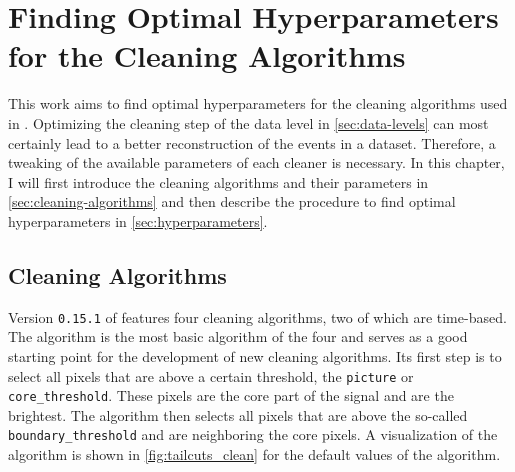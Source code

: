 \chapter{Finding Optimal Hyperparameters for the Cleaning Algorithms}
\label{ch:finding-hyperparams}

This work aims to find optimal hyperparameters for the cleaning algorithms used in \ctapipe{}.
Optimizing the cleaning step of the \dlo{} data level in \autoref{sec:data-levels} can most certainly lead to a better
reconstruction of the events in a dataset. Therefore, a tweaking of the available parameters of each
cleaner is necessary. In this chapter, I will first introduce the cleaning algorithms and their parameters
in \autoref{sec:cleaning-algorithms} and then describe the procedure to find optimal hyperparameters
in \autoref{sec:hyperparameters}.

\section{Cleaning Algorithms}
\label{sec:cleaning-algorithms}

Version \texttt{0.15.1} of \ctapipe{} features four cleaning algorithms, two of which are time-based.
The \tailcuts{} algorithm is the most basic algorithm of the four and serves as a good
starting point for the development of new cleaning algorithms. Its first step is to select all
pixels that are above a certain threshold, the \texttt{picture} or \texttt{core\_threshold}. These
pixels are the core part of the signal and are the brightest. The \tailcuts{} algorithm
then selects all pixels that are above the so-called \texttt{boundary\_threshold} and are neighboring
the core pixels. A visualization of the algorithm is shown in \autoref{fig:tailcuts_clean} for the
default values of the algorithm.

